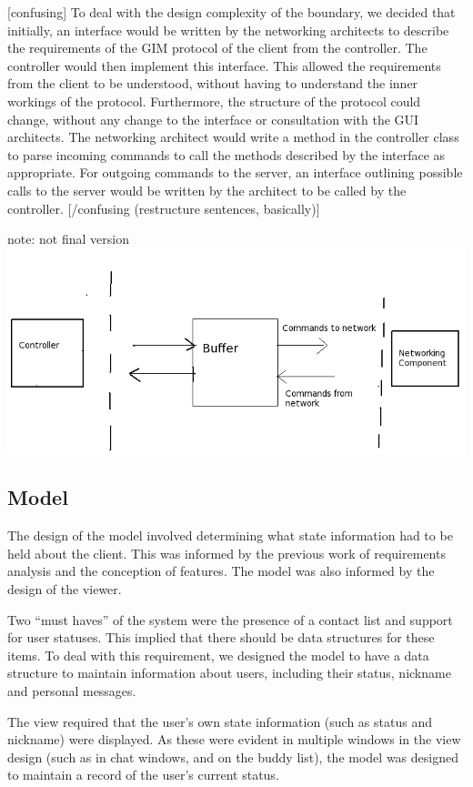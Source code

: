 [confusing] To deal with the design complexity of the boundary, we decided that initially, an interface would be written by the networking architects to describe the requirements of the GIM protocol of the client from the controller. The controller would then implement this interface. This allowed the requirements from the client to be understood, without having to understand the inner workings of the protocol. Furthermore, the structure of the protocol could change, without any change to the interface or consultation with the GUI architects. The networking architect would write a method in the controller class to parse incoming commands to call the methods described by the interface as appropriate. For outgoing commands to the server, an interface outlining possible calls to the server would be written by the architect to be called by the controller. [/confusing (restructure sentences, basically)]

note: not final version
\includegraphics[scale=0.65]{Design/diagrams/buffer.png}

\subsection {Model}

The design of the model involved determining what state information had to be held about the client. This was informed by the previous work of requirements analysis and the conception of features. The model was also informed by the design of the viewer.

Two ``must haves'' of the system were the presence of a contact list and support for user statuses. This implied that there should be data structures for these items. To deal with this requirement, we designed the model to have a data structure to maintain information about users, including their status, nickname and personal messages. 

The view required that the user's own state information (such as status and nickname) were displayed. As these were evident in multiple windows in the view design (such as in chat windows, and on the buddy list), the model was designed to maintain a record of the user's current status. 

